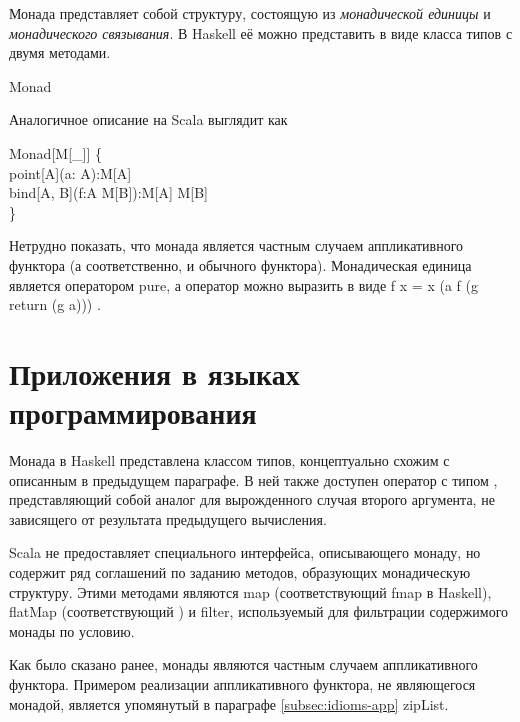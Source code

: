 Монада представляет собой структуру, состоящую из \emph{монадической единицы} и \emph{монадического связывания}. В Haskell её можно представить в виде класса типов с двумя методами.

\begin{haskell}
 Monad \mu {} \\
\quad{}
\end{haskell}

Аналогичное описание на Scala выглядит как

\begin{haskell}
 Monad[M[\_]] \{ \\
\quad{} point[A](a: A):M[A] \\
\quad{} bind[A, B](f:A \Rightarrow M[B]):M[A] \Rightarrow M[B] \\
\}
\end{haskell}

Нетрудно показать, что монада является частным случаем аппликативного функтора (а соответственно, и обычного функтора). Монадическая единица является оператором \<pure\>, а оператор \<\circledast\> можно выразить в виде \<f \circledast x = x \hsbind (\lambda a \to f \hsbind (\lambda g \to  return (g a))) \>.

\section{Приложения в языках программирования}
Монада в Haskell представлена классом типов, концептуально схожим с описанным в предыдущем параграфе. В ней также доступен оператор \<\mathbin{>\mkern-7mu>}\> с типом \<\mu \alpha \to \mu \beta \to \mu \beta\>, представляющий собой аналог \<\hsbind\> для вырожденного случая второго аргумента, не зависящего от результата предыдущего вычисления.

Scala не предоставляет специального интерфейса, описывающего монаду, но содержит ряд соглашений по заданию методов, образующих монадическую структуру. Этими методами являются \<map\> (соответствующий \<fmap\> в Haskell), \<flatMap\> (соответствующий \<\hsbind\>) и \<filter\>, используемый для фильтрации содержимого монады по условию.

Как было сказано ранее, монады являются частным случаем аппликативного функтора. Примером реализации аппликативного функтора, не являющегося монадой, является упомянутый в параграфе \ref{subsec:idioms-app} \<zipList\>.

